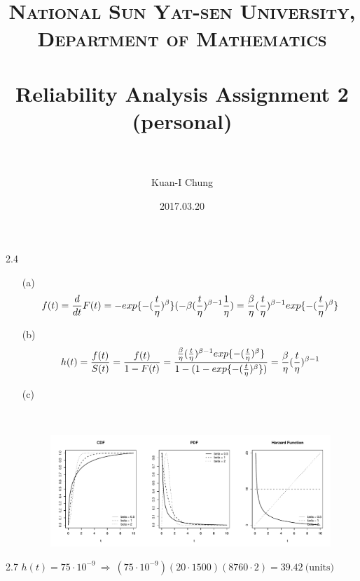 \documentclass[paper=a4, fontsize=12pt]{scrartcl} %
\title{	
\normalfont \normalsize 
\textsc{National Sun Yat-sen University, Department of Mathematics} \\ [25pt] %
\horrule{0.5pt} \\[0.4cm] %
\huge Reliability Analysis Assignment 2 \\(personal)\\ %
\horrule{2pt} \\[0.5cm] %
}
\author{Kuan-I Chung} %
\date{\normalsize 2017.03.20} %
\numberwithin{equation}{section} %
\numberwithin{figure}{section} %
\numberwithin{table}{section} %
\begin{document}
\maketitle %

2.4
\begin{itemize}

	\item[(a)]{
		\begin{equation*}
			f(t) = \frac{d}{dt}F(t) 	=  -exp\{-(\frac{t}{\eta})^\beta\}(-\beta(\frac{t}{\eta})^{\beta-1}\frac{1}{\eta})\\
						       	=  \frac{\beta}{\eta}(\frac{t}{\eta})^{\beta-1}exp\{ -(\frac{t}{\eta})^\beta\}
		\end{equation*}
	}
	
	\item[(b)]{
		\begin{equation*}
			h(t) 	= \frac{f(t)}{S(t)} = \frac{f(t)}{1-F(t)}\\
				= \frac{\frac{\beta}{\eta}(\frac{t}{\eta})^{\beta-1}exp\{ -(\frac{t}{\eta})^\beta\}}
					{1-(1-exp\{-(\frac{t}{\eta})^\beta \})} = \frac{\beta}{\eta}(\frac{t}{\eta})^{\beta-1}
		\end{equation*}
	}
	
	\item[(c)]{
		\
		\begin{figure}[h]
			\includegraphics[width = 4.8 in]{2_4_c.pdf}
		\end{figure}
	}

\end{itemize}

2.7 \qquad $h(t) = 75 \cdot 10^{-9}\  \Rightarrow \ (75 \cdot 10^{-9})(20 \cdot 1500)(8760 \cdot 2) = 39.42\ \text{(units)} $\\
\end{document}
